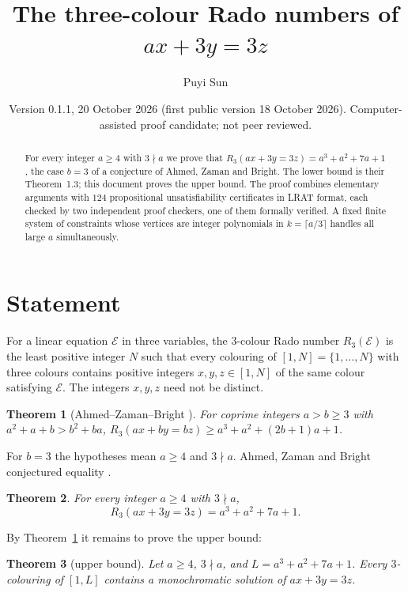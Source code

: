 \documentclass[11pt]{amsart}
\title{The three-colour Rado numbers of $ax+3y=3z$}
\author{Puyi Sun}
\date{Version 0.1.1, 20 October 2026 (first public version 18 October 2026). Computer-assisted proof candidate; not peer reviewed.}
\newtheorem{theorem}{Theorem}[section]
\theoremstyle{definition}
\theoremstyle{remark}
\begin{document}
\begin{abstract}
For every integer $a\ge4$ with $3\nmid a$ we prove that $R_3(ax+3y=3z)=a^3+a^2+7a+1$, the case $b=3$ of a
conjecture of Ahmed, Zaman and Bright. The lower bound is their Theorem~1.3; this document proves the upper bound.
The proof combines elementary arguments with $124$ propositional unsatisfiability certificates in LRAT format,
each checked by two independent proof checkers, one of them formally verified. A fixed finite system of constraints
whose vertices are integer polynomials in $k=\lceil a/3\rceil$ handles all large $a$ simultaneously.
\end{abstract}
\maketitle

\tableofcontents

\section{Statement}

For a linear equation $\mathcal E$ in three variables, the $3$-colour Rado number $R_3(\mathcal E)$ is the least
positive integer $N$ such that every colouring of $[1,N]=\{1,\dots,N\}$ with three colours contains positive integers
$x,y,z\in[1,N]$ of the same colour satisfying $\mathcal E$. The integers $x,y,z$ need not be distinct.

\begin{theorem}[Ahmed--Zaman--Bright {\cite[Thm.~1.3]{AZB}}]\label{thm:azb}
For coprime integers $a>b\ge3$ with $a^2+a+b>b^2+ba$, $R_3(ax+by=bz)\ge a^3+a^2+(2b+1)a+1$.
\end{theorem}

For $b=3$ the hypotheses mean $a\ge4$ and $3\nmid a$. Ahmed, Zaman and Bright conjectured equality
\cite[Conj.~1.1]{AZB}.

\begin{theorem}\label{thm:main}
For every integer $a\ge4$ with $3\nmid a$,
\[R_3(ax+3y=3z)=a^3+a^2+7a+1 .\]
\end{theorem}

By Theorem~\ref{thm:azb} it remains to prove the upper bound:

\begin{theorem}[upper bound]\label{thm:upper}
Let $a\ge4$, $3\nmid a$, and $L=a^3+a^2+7a+1$. Every $3$-colouring of $[1,L]$ contains a monochromatic solution of
$ax+3y=3z$.
\end{theorem}
\end{document}
